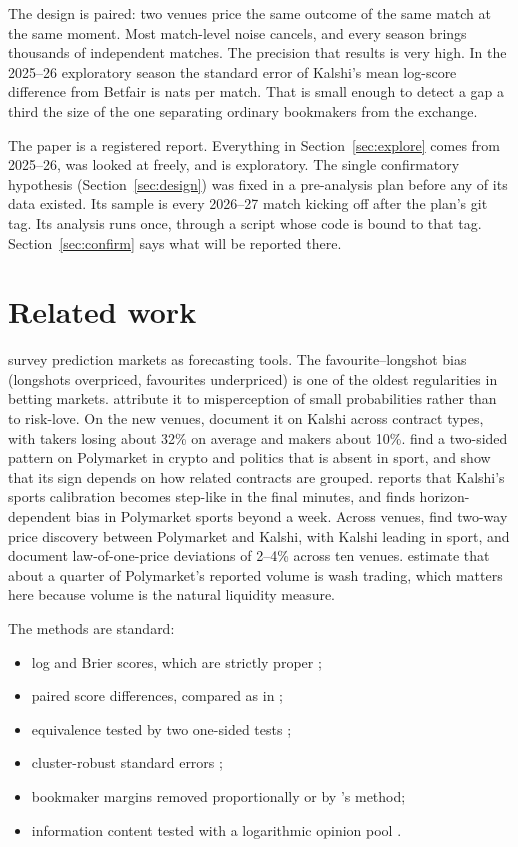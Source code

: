\documentclass[11pt]{article}
\begin{document}
The design is paired: two venues price the same outcome of the same match at the same moment.
Most match-level noise cancels, and every season brings thousands of independent matches. The
precision that results is very high. In the 2025--26 exploratory season the standard error of
Kalshi's mean log-score difference from Betfair is \rqOneSeK{} nats per match. That is small
enough to detect a gap a third the size of the one separating ordinary bookmakers from the
exchange.

The paper is a registered report. Everything in Section~\ref{sec:explore} comes from 2025--26,
was looked at freely, and is exploratory. The single confirmatory hypothesis
(Section~\ref{sec:design}) was fixed in a pre-analysis plan before any of its data existed. Its
sample is every 2026--27 match kicking off after the plan's git tag. Its analysis runs once,
through a script whose code is bound to that tag. Section~\ref{sec:confirm} says what will be
reported there.

\section{Related work}

\citet{wolfers2004} survey prediction markets as forecasting tools. The favourite--longshot bias
(longshots overpriced, favourites underpriced) is one of the oldest regularities in betting
markets. \citet{snowberg2010} attribute it to misperception of small probabilities rather than to
risk-love. On the new venues, \citet{burgi2025} document it on Kalshi across contract types,
with takers losing about 32\% on average and makers about 10\%. \citet{cardozo2026} find a
two-sided pattern on Polymarket in crypto and politics that is absent in sport, and show that its
sign depends on how related contracts are grouped. \citet{moshrefi2026} reports that Kalshi's
sports calibration becomes step-like in the final minutes, and \citet{le2026} finds
horizon-dependent bias in Polymarket sports beyond a week. Across venues, \citet{ng2025} find
two-way price discovery between Polymarket and Kalshi, with Kalshi leading in sport, and
\citet{gebele2026} document law-of-one-price deviations of 2--4\% across ten venues.
\citet{kanoria2025} estimate that about a quarter of Polymarket's reported volume is wash
trading, which matters here because volume is the natural liquidity measure.

The methods are standard:
\begin{itemize}
  \item log and Brier scores, which are strictly proper \citep{gneiting2007};
  \item paired score differences, compared as in \citet{diebold1995};
  \item equivalence tested by two one-sided tests \citep{schuirmann1987,lakens2017};
  \item cluster-robust standard errors \citep{cameron2015};
  \item bookmaker margins removed proportionally or by \citet{shin1993}'s method;
  \item information content tested with a logarithmic opinion pool \citep{genest1986}.
\end{itemize}
\end{document}
